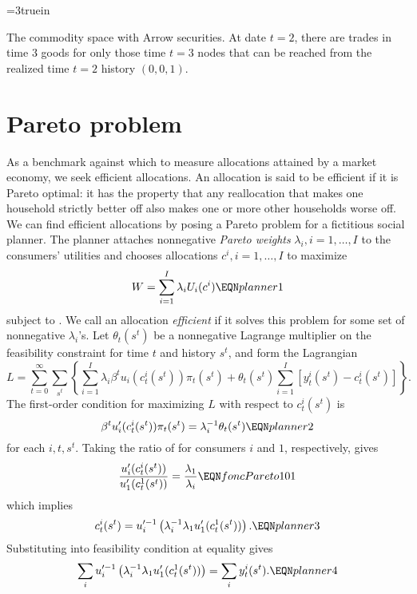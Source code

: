 \centerline{\epsfxsize=3truein} \caption{The
commodity space with Arrow securities.  At date $t=2$, there are
trades in time $3$ goods for only those time $t=3$ nodes that can
be reached from the realized time $t=2$ history $(0,0, 1)$.}
\endfigure

\section{Pareto problem}
As a benchmark against which to measure allocations attained by a
market  economy, we seek efficient allocations. An allocation is
said to be efficient if it is Pareto optimal: it has the property
that any reallocation  that makes one household strictly better
off also makes one or more other households worse off. We can find
efficient allocations by posing a Pareto problem for a fictitious
social planner. The  planner attaches nonnegative {\it Pareto
weights\/} $\lambda_i, i=1, \ldots, I$ to the consumers' utilities and
chooses allocations $c^i, i=1, \ldots, I$ to maximize
$$ W = \sum_{i=1}^I \lambda_i U_i(c^i)  \EQN planner1  $$
subject to .
We call an allocation {\it efficient\/}
if it solves this problem for some set of
nonnegative $\lambda_i$'s.
Let $\theta_t(s^t)$ be a nonnegative Lagrange multiplier on the
feasibility constraint 
for time  $t$ and  history  $s^t$,  and form
the Lagrangian
$$ L =
 \sum_{t=0}^\infty \sum_{s^t}
   \left\{  \sum_{i=1}^I \lambda_i \beta^t u_i(c_t^i(s^t)) \pi_t(s^t)
     + \theta_t(s^t) \sum_{i=1}^I [ y_t^i(s^t) - c_t^i(s^t) ]  \right\} . $$
The first-order condition for maximizing $L$
with respect to $c_t^i(s^t)$ is
$$ \beta^t u'_i(c_t^i(s^t))\pi_t(s^t) = \lambda_i^{-1}  \theta_t(s^t)
\EQN planner2 $$
for each $i, t, s^t$.  Taking the ratio of  for  consumers
$i$ and $1$, respectively,
gives
$$ {u'_i(c^i_t(s^t)) \over u'_1(c^1_t(s^t))} = {\lambda_1  \over \lambda_i}  \EQN foncPareto101 $$
which implies
$$ c_t^i(s^t) = u^{\prime -1}_i
    \left(\lambda_i^{-1} \lambda_1 u'_1(c_t^1(s^t)) \right). \EQN planner3
$$
Substituting  into feasibility condition  at
equality gives
$$ \sum_i u^{\prime -1}_i
    \left(\lambda_i^{-1} \lambda_1 u'_1(c_t^1(s^t)) \right)
  = \sum_i y_t^i(s^t)  . \EQN planner4 $$
